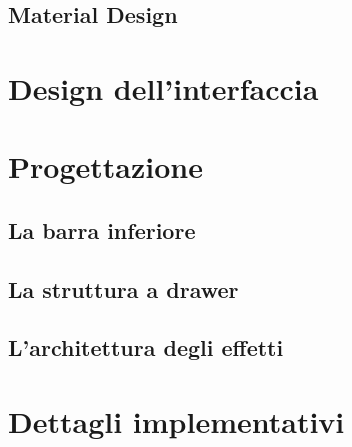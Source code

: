     \subsection{Material Design}\label{sub:material}
  \section{Design dell'interfaccia}\label{sec:design}
  \section{Progettazione}\label{sec:progettazione}
      \subsection{La barra inferiore}\label{sub:barra}
      \subsection{La struttura a drawer}\label{sub:drawer}
      \subsection{L'architettura degli effetti}\label{sub:effetti}
  \section{Dettagli implementativi}\label{sec:dettagli}
